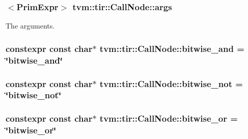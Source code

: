 \subsubsection[{\texorpdfstring{args}{args}}]{$<${\bf Prim\+Expr}$>$ tvm\+::tir\+::\+Call\+Node\+::args}\hypertarget{classtvm_1_1tir_1_1CallNode_a7ca077747fdb2bcb63ca1cac4a49017f}{}\label{classtvm_1_1tir_1_1CallNode_a7ca077747fdb2bcb63ca1cac4a49017f}


The arguments. 

\subsubsection[{\texorpdfstring{bitwise\+\_\+and}{bitwise_and}}]{\setlength{\rightskip}{0pt plus 5cm}constexpr const char$\ast$ tvm\+::tir\+::\+Call\+Node\+::bitwise\+\_\+and = \char`\"{}bitwise\+\_\+and\char`\"{}\hspace{0.3cm}{\ttfamily [static]}}\hypertarget{classtvm_1_1tir_1_1CallNode_a45ce5bd93c09588f4961bf0683f8ec17}{}\label{classtvm_1_1tir_1_1CallNode_a45ce5bd93c09588f4961bf0683f8ec17}
\subsubsection[{\texorpdfstring{bitwise\+\_\+not}{bitwise_not}}]{\setlength{\rightskip}{0pt plus 5cm}constexpr const char$\ast$ tvm\+::tir\+::\+Call\+Node\+::bitwise\+\_\+not = \char`\"{}bitwise\+\_\+not\char`\"{}\hspace{0.3cm}{\ttfamily [static]}}\hypertarget{classtvm_1_1tir_1_1CallNode_a0a1a5c29a08482fe66ff955f35bde07b}{}\label{classtvm_1_1tir_1_1CallNode_a0a1a5c29a08482fe66ff955f35bde07b}
\subsubsection[{\texorpdfstring{bitwise\+\_\+or}{bitwise_or}}]{\setlength{\rightskip}{0pt plus 5cm}constexpr const char$\ast$ tvm\+::tir\+::\+Call\+Node\+::bitwise\+\_\+or = \char`\"{}bitwise\+\_\+or\char`\"{}\hspace{0.3cm}{\ttfamily [static]}}\hypertarget{classtvm_1_1tir_1_1CallNode_abba6095e415d3cfd5006406c0f68758e}{}\label{classtvm_1_1tir_1_1CallNode_abba6095e415d3cfd5006406c0f68758e}
